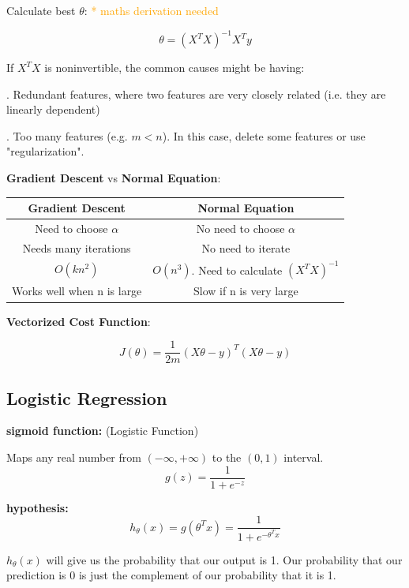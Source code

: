 \documentclass{article}
\begin{document}
\noindent Calculate best \(\theta\): \textcolor{orange}{ * maths derivation needed}

\[
\theta = (X^TX)^{-1}X^Ty
\]

\noindent If \(X^TX\) is noninvertible, the common causes might be having:

. Redundant features, where two features are very closely related (i.e. they are linearly dependent)

. Too many features (e.g. \(m < n\)). In this case, delete some features or use "regularization".

\bigskip

\noindent \textbf{Gradient Descent} vs \textbf{Normal Equation}:

\begin{center}
\begin{tabular}{ | c | c | } 
\hline
\textbf{Gradient Descent} & \textbf{Normal Equation} \\ 
\hline
Need to choose \(\alpha\) & No need to choose \(\alpha\) \\ 
\hline
Needs many iterations & No need to iterate \\ 
\hline
\(O(kn^2)\) & \(O(n^3)\). Need to calculate \((X^TX)^{-1}\) \\ 
\hline
Works well when n is large & Slow if n is very large \\ 
\hline
\end{tabular}
\end{center}

\noindent \textbf{Vectorized Cost Function}:

\[J(\theta) = \frac{1}{2m} (X\theta - y)^T(X\theta - y)\]

\subsection{Logistic Regression}

\noindent \textbf{sigmoid function:} (Logistic Function)

\noindent Maps any real number from \((-\infty, +\infty)\) to the \((0, 1)\) interval.
\[g(z) = \frac{1}{1 + e^{-z}}\]

\noindent \textbf{hypothesis:}
\[
h_{\theta}(x) 
= g(\theta^T x)
= \frac{1}{1 + e^{-\theta^T x}}
\]

\noindent \(h_{\theta}(x)\) will give us the probability that our output is 1. Our probability that our prediction is 0 is just the complement of our probability that it is 1.
\end{document}
